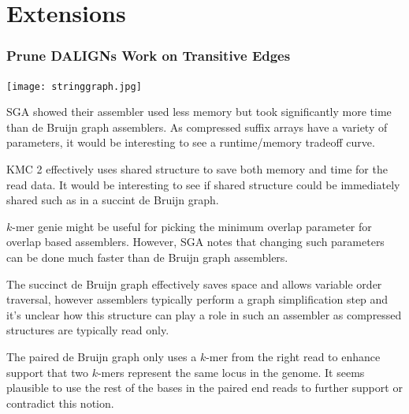 \documentclass{beamer}
\begin{document}
\section{Extensions}
\begin{frame}
\frametitle{Prune DALIGNs Work on Transitive Edges}

\texttt{[image: stringgraph.jpg]}

% 
\end{frame}
\begin{frame}
SGA showed their assembler used less memory but took significantly more time than de Bruijn graph assemblers.  As compressed suffix arrays have a variety of parameters, it would be interesting to see a runtime/memory tradeoff curve.

\end{frame}
\begin{frame}
KMC 2 effectively uses shared structure to save both memory and time for the read data.  It would be interesting to see if shared structure could be immediately shared such as in a succint de Bruijn graph.

\end{frame}
\begin{frame}
$k$-mer genie might be useful for picking the minimum overlap parameter for overlap based assemblers.  However, SGA notes that changing such parameters can be done much faster than de Bruijn graph assemblers.

\end{frame}
\begin{frame}
The succinct de Bruijn graph effectively saves space and allows variable order traversal, however assemblers typically perform a graph simplification step and it's unclear how this structure can play a role in such an assembler as compressed structures are typically read only.

\end{frame}
\begin{frame}
The paired de Bruijn graph only uses a $k$-mer from the right read to enhance support that two $k$-mers represent the same locus in the genome.  It seems plausible to use the rest of the bases in the paired end reads to further support or contradict this notion.

\end{frame}
\end{document}
